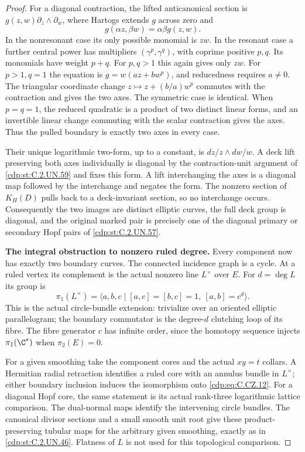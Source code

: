 \begin{proof}
For a diagonal contraction, the lifted
anticanonical section is
$g(z,w)\partial_z\wedge\partial_w$,
where Hartogs extends $g$ across zero
and
\[
                        g(\alpha z,\beta w)
                                      =\alpha\beta g(z,w).
\tag{C.CZ.11}\label{cdp:eq:C.CZ.11}
\]
In the nonresonant case its only
possible monomial is $zw$.
In the resonant case a further central
power has multipliers $(\gamma^p,\gamma^q)$,
with coprime positive $p,q$.
Its monomials have weight $p+q$.
For $p,q>1$ this again gives only
$zw$. For $p>1,q=1$ the equation is
$g=w(az+bw^p)$, and reducedness
requires $a\ne0$. The triangular
coordinate change $z\mapsto z+(b/a)w^p$
commutes with the contraction and
gives the two axes. The symmetric
case is identical. When $p=q=1$,
the reduced quadratic is a product
of two distinct linear forms, and
an invertible linear change commuting
with the scalar contraction gives
the axes. Thus the pulled boundary
is exactly two axes in every case.

Their unique logarithmic two-form,
up to a constant, is
$dz/z\wedge dw/w$. A deck lift
preserving both axes individually
is diagonal by the contraction-unit
argument of \ref{cdp:st:C.2.UN.59} and fixes this
form. A lift interchanging the axes
is a diagonal map followed by the
interchange and negates the form.
The nonzero section of $K_H(D)$
pulls back to a deck-invariant
section, so no interchange occurs.
Consequently the two images are
distinct elliptic curves, the full
deck group is diagonal, and the
original marked pair is precisely
one of the diagonal primary or
secondary Hopf pairs of \ref{cdp:st:C.2.UN.57}.

\par\medskip\noindent\textbf{The integral obstruction to nonzero ruled degree.}
Every component now has exactly two
boundary curves. The connected
incidence graph is a cycle. At a
ruled vertex its complement is the
actual nonzero line $L^\times$ over
$E$. For $d=\deg L$ its group is
\[
 \pi_1(L^\times)=
 \langle a,b,c\mid [a,c]=[b,c]=1,
                               \ [a,b]=c^d\rangle .
\tag{C.CZ.12}\label{cdp:eq:C.CZ.12}
\]
This is the actual circle-bundle
extension: trivialize over an
oriented elliptic parallelogram;
the boundary commutator is the
degree-$d$ clutching loop of its
fibre. The fibre generator $c$
has infinite order, since the
homotopy sequence injects
$\pi_1(\C^*)$ when $\pi_2(E)=0$.

For a given smoothing take the
component cores and the actual
$xy=t$ collars. A Hermitian radial
retraction identifies a ruled
core with an annulus bundle in
$L^\times$; either boundary
inclusion induces the isomorphism
onto \eqref{cdp:eq:C.CZ.12}. For a diagonal
Hopf core, the same statement is
its actual rank-three logarithmic
lattice comparison. The dual-normal
maps identify the intervening
circle bundles. The canonical
divisor sections and a small smooth
unit root give these product-preserving
tubular maps for the arbitrary
given smoothing, exactly as in
\ref{cdp:st:C.2.UN.46}. Flatness of $L$ is not used
for this topological comparison.


\end{proof}
